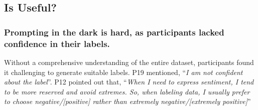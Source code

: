 \subsection{Is \system Useful?}



\subsubsection{Prompting in the dark is hard, as participants lacked confidence in their labels.}
Without a comprehensive understanding of the entire dataset, participants found it challenging to generate suitable labels.
P19 mentioned, ``\textit{I am not confident about the label}''.
P12 pointed out that, ``\textit{When I need to express sentiment, I tend to be more reserved and avoid extremes. So, when labeling data, I usually prefer to choose negative/[positive] rather than extremely negative/[extremely positive]}''







